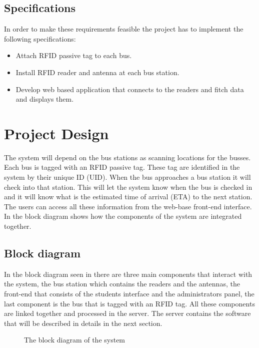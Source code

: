 \documentclass[a4paper,twoside]{article}
\begin{document}
\subsection{Specifications}
In order to make these requirements feasible the project has to implement the following specifications:
\begin{itemize}
\item 
Attach RFID passive tag to each bus.
\item
Install RFID reader and antenna at each bus station.
\item
Develop web based application that connects to the readers and fitch data and displays them.
\end{itemize}


\section{Project Design}
The system will depend on the bus stations as scanning locations for the busses. Each bus is tagged with an RFID passive tag. These tag are identified in the system by their unique ID (UID). When the bus approaches a bus station it will check into that station. This will let the system know when the bus is checked in and it will know what is the estimated time of arrival (ETA) to the next station. The users can access all these information from the web-base front-end interface. In  the block diagram shows how the components of the system are integrated together.
\subsection{Block diagram}
In the block diagram seen in  there are three main components that interact with the system, the bus station which contains the readers and the antennas, the front-end that consists of the students interface and the administrators panel, the last component is the bus that is tagged with an RFID tag. All these components are linked together and processed in the server. The server contains the software that will be described in details in the next section.
\begin{figure}
\centering
{}
\caption{The block diagram of the system}
\label{blockdiagram}
\end{figure}
\end{document}
